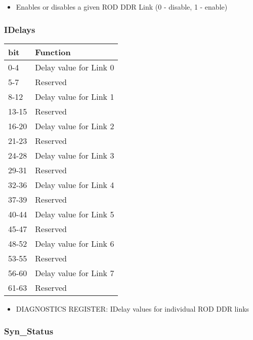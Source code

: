 \begin{itemize}
\item Enables or disables a given ROD DDR Link (0 - disable, 1 - enable)
\end{itemize}




\subsubsection{IDelays}

\begin {table}[H]
\begin{center}
\begin{tabular}{|l|l|}
\hline
\textbf{bit} & \textbf{Function} \\
\hline
0-4 & Delay value for Link 0 \\
\hline
5-7 & Reserved \\
\hline
8-12 & Delay value for Link 1 \\
\hline
13-15 & Reserved \\
\hline
16-20 & Delay value for Link 2 \\
\hline
21-23 & Reserved \\
\hline
24-28 & Delay value for Link 3 \\
\hline
29-31 & Reserved \\
\hline
32-36 & Delay value for Link 4 \\
\hline
37-39 & Reserved \\
\hline
40-44 & Delay value for Link 5 \\
\hline
45-47 & Reserved \\
\hline
48-52 & Delay value for Link 6 \\
\hline
53-55 & Reserved \\
\hline
56-60 & Delay value for Link 7 \\
\hline
61-63 & Reserved \\
\hline
\end{tabular}
\end{center}
\end{table}


\begin{itemize}
\item DIAGNOSTICS REGISTER: IDelay values for individual ROD DDR links
\end{itemize}



\subsubsection{Syn\_Status}

